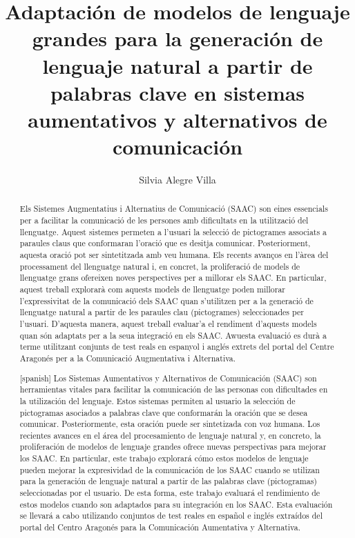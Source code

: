 \documentclass[11pt,spanish,listoffigures,listoftables]{tfgetsinf}
\title{Adaptación de modelos de lenguaje grandes para la generación
de lenguaje natural a partir de palabras clave en sistemas
aumentativos y alternativos de comunicación}
\author{Silvia Alegre Villa}
\begin{document}

\begin{abstract}
Els Sistemes Augmentatius i Alternatius de Comunicació (SAAC) son eines essencials per a facilitar la comunicació de les persones amb dificultats en la utilització del llenguatge. Aquest sistemes permeten a l'usuari la selecció de pictogrames associats a paraules claus que conformaran l'oració que es desitja comunicar. Posteriorment, aquesta oració pot ser sintetitzada amb veu humana. Els recents avanços en l'àrea del processament del llenguatge natural i, en concret, la proliferació de models de llenguatge grans ofereixen noves perspectives per a millorar els SAAC. En particular, aquest treball explorarà com aquests models de llenguatge poden millorar l'expressivitat de la comunicació dels SAAC quan s'utilitzen per a la generació de llenguatge natural a partir de les paraules clau (pictogrames) seleccionades per l'usuari. D'aquesta manera, aquest treball evaluar'a el rendiment d'aquests models quan són adaptats per a la seua integració en els SAAC. Awuesta evaluació es durà a terme utilitzant conjunts de test reals en espanyol i anglés extrets del portal del Centre Aragonés per a la Comunicació Augmentativa i Alternativa.
\end{abstract}
\begin{abstract}[spanish]
 Los Sistemas Aumentativos y Alternativos de Comunicación (SAAC) son herramientas vitales para facilitar la comunicación de las personas con dificultades en la utilización del lenguaje. Estos sistemas permiten al usuario la selección de pictogramas asociados a palabras clave que conformarán la oración que se desea comunicar. Posteriormente, esta oración puede ser sintetizada con voz humana. Los recientes avances en el área del procesamiento de lenguaje natural y, en concreto, la proliferación de modelos de lenguaje grandes ofrece nuevas perspectivas para mejorar los SAAC. En particular, este trabajo explorará cómo estos modelos de lenguaje pueden mejorar la expresividad de la comunicación de los SAAC cuando se utilizan para la generación de lenguaje natural a partir de las palabras clave (pictogramas) seleccionadas por el usuario. De esta forma, este trabajo evaluará el rendimiento de estos modelos cuando son adaptados para su integración en los SAAC. Esta evaluación se llevará a cabo utilizando conjuntos de test reales en español e inglés extraídos del portal del Centro Aragonés para la Comunicación Aumentativa y Alternativa.
\end{abstract}
\end{document}
